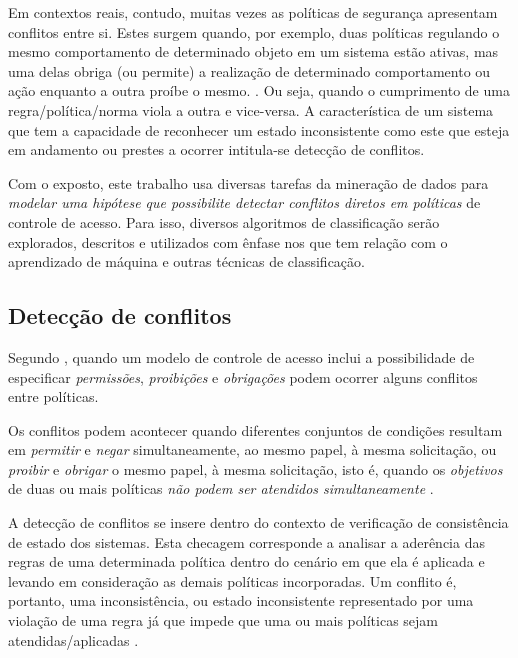 \documentclass[
	12pt,				%
	openright,			%
	oneside,			%
	a4paper,			%
	english,			%
	french,				%
	spanish,			%
	brazil				%
	]{abntex2}
\begin{document}
Em contextos reais, contudo, muitas vezes as políticas de segurança apresentam conflitos entre si. Estes surgem quando, por exemplo, duas políticas regulando o mesmo comportamento de determinado objeto em um sistema estão ativas, mas uma delas obriga (ou permite) a realização de determinado comportamento ou ação enquanto a outra proíbe o mesmo. \cite{lupu_conflicts_1999} \cite{eduardo2017}. Ou seja, quando o cumprimento de uma regra/política/norma viola a outra e vice-versa. A característica de um sistema que tem a capacidade de reconhecer um estado inconsistente como este que esteja em andamento ou prestes a ocorrer intitula-se detecção de conflitos.

Com o exposto, este trabalho usa diversas tarefas da mineração de dados para \textit{modelar uma hipótese que possibilite detectar conflitos diretos em políticas} de controle de acesso. Para isso, diversos algoritmos de classificação serão explorados, descritos e utilizados com ênfase nos que tem relação com o aprendizado de máquina e outras técnicas de classificação.

\subsection{Detecção de conflitos} \label{deteccao_conflitos}

Segundo , quando um modelo de controle de acesso inclui a possibilidade de especificar \textit{permissões}, \textit{proibições} e \textit{obrigações} podem ocorrer alguns conflitos entre políticas. 

Os conflitos podem acontecer quando diferentes conjuntos de condições resultam em \textit{permitir} e \textit{negar} simultaneamente, ao mesmo papel, à mesma solicitação, ou \textit{proibir} e \textit{obrigar} o mesmo papel, à mesma solicitação, isto é, quando os \textit{objetivos} de duas ou mais políticas \textit{não podem ser atendidos simultaneamente} \cite{cuppens_high_2007}.

A detecção de conflitos se insere dentro do contexto de verificação de consistência de estado dos sistemas. Esta checagem corresponde a analisar a aderência das regras de uma determinada política dentro do cenário em que ela é aplicada e levando em consideração as demais políticas incorporadas. Um conflito é, portanto, uma inconsistência, ou estado inconsistente representado por uma violação de uma regra já que impede que uma ou mais políticas sejam atendidas/aplicadas \cite{ueda_tese_2012}. 
\end{document}
